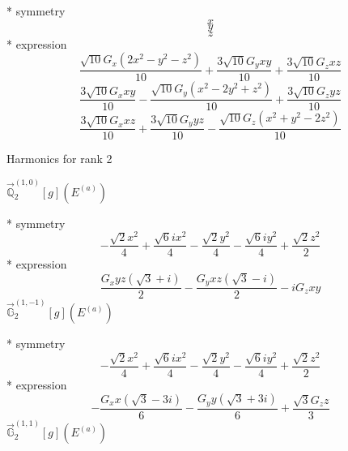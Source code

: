 \documentclass[fleqn,8pt]{jsarticle}
\begin{document}
\noindent\quad ** symmetry
\begin{dmath*}
x
\end{dmath*}
\begin{dmath*}
y
\end{dmath*}
\begin{dmath*}
z
\end{dmath*}
\noindent\quad ** expression
\begin{dmath*}
\frac{\sqrt{10} G_{x} \left(2 x^{2} - y^{2} - z^{2}\right)}{10} + \frac{3 \sqrt{10} G_{y} x y}{10} + \frac{3 \sqrt{10} G_{z} x z}{10}
\end{dmath*}
\begin{dmath*}
\frac{3 \sqrt{10} G_{x} x y}{10} - \frac{\sqrt{10} G_{y} \left(x^{2} - 2 y^{2} + z^{2}\right)}{10} + \frac{3 \sqrt{10} G_{z} y z}{10}
\end{dmath*}
\begin{dmath*}
\frac{3 \sqrt{10} G_{x} x z}{10} + \frac{3 \sqrt{10} G_{y} y z}{10} - \frac{\sqrt{10} G_{z} \left(x^{2} + y^{2} - 2 z^{2}\right)}{10}
\end{dmath*}

\noindent * Harmonics for rank 2

\noindent\quad $\vec{\mathbb{Q}}_{2}^{(1,0)}[g](E^{(a)})$

\noindent\quad ** symmetry
\begin{dmath*}
- \frac{\sqrt{2} x^{2}}{4} + \frac{\sqrt{6} i x^{2}}{4} - \frac{\sqrt{2} y^{2}}{4} - \frac{\sqrt{6} i y^{2}}{4} + \frac{\sqrt{2} z^{2}}{2}
\end{dmath*}
\noindent\quad ** expression
\begin{dmath*}
\frac{G_{x} y z \left(\sqrt{3} + i\right)}{2} - \frac{G_{y} x z \left(\sqrt{3} - i\right)}{2} - i G_{z} x y
\end{dmath*}
\noindent\quad $\vec{\mathbb{G}}_{2}^{(1,-1)}[g](E^{(a)})$

\noindent\quad ** symmetry
\begin{dmath*}
- \frac{\sqrt{2} x^{2}}{4} + \frac{\sqrt{6} i x^{2}}{4} - \frac{\sqrt{2} y^{2}}{4} - \frac{\sqrt{6} i y^{2}}{4} + \frac{\sqrt{2} z^{2}}{2}
\end{dmath*}
\noindent\quad ** expression
\begin{dmath*}
- \frac{G_{x} x \left(\sqrt{3} - 3 i\right)}{6} - \frac{G_{y} y \left(\sqrt{3} + 3 i\right)}{6} + \frac{\sqrt{3} G_{z} z}{3}
\end{dmath*}
\noindent\quad $\vec{\mathbb{G}}_{2}^{(1,1)}[g](E^{(a)})$
\end{document}
